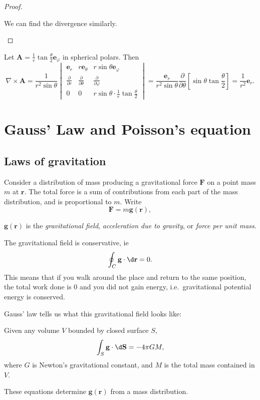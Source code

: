 \documentclass[a4paper]{article}
\begin{document}
\begin{proof}
\begin{enumerate}
      We can find the divergence similarly.
  \end{enumerate}
\end{proof}

\begin{eg}
  Let $\mathbf{A} = \frac{1}{r}\tan \frac{\theta}{2} \mathbf{e}_\varphi$ in spherical polars. Then
  \[
    \nabla\times \mathbf{A} = \frac{1}{r^2\sin \theta}
    \begin{vmatrix}
      \mathbf{e}_r & r\mathbf{e}_\theta & r\sin \theta \mathbf{e}_\varphi\\
      \frac{\partial}{\partial r} & \frac{\partial}{\partial \theta} & \frac{\partial}{\partial \varphi}\\
      0 & 0 & r\sin \theta \cdot \frac{1}{r}\tan \frac{\theta}{2}
    \end{vmatrix} = \frac{\mathbf{e}_r}{r^2\sin \theta}\frac{\partial}{\partial \theta}\left[\sin \theta\tan \frac{\theta}{2}\right] = \frac{1}{r^2}\mathbf{e}_r.
  \]
\end{eg}

\section{Gauss' Law and Poisson's equation}
\subsection{Laws of gravitation}
Consider a distribution of mass producing a gravitational force $\mathbf{F}$ on a point mass $m$ at $\mathbf{r}$. The total force is a sum of contributions from each part of the mass distribution, and is proportional to $m$. Write
\[
  \mathbf{F} = m\mathbf{g}(\mathbf{r}),
\]
\begin{defi}
  $\mathbf{g}(\mathbf{r})$ is the \emph{gravitational field}, \emph{acceleration due to gravity}, or \emph{force per unit mass}.
\end{defi}
The gravitational field is conservative, ie
\[
  \oint_C \mathbf{g}\cdot \d \mathbf{r} = 0.
\]
This means that if you walk around the place and return to the same position, the total work done is $0$ and you did not gain energy, i.e.\ gravitational potential energy is conserved.

Gauss' law tells us what this gravitational field looks like:
\begin{law}
  Given any volume $V$ bounded by closed surface $S$,
  \[
    \int_S \mathbf{g}\cdot \d \mathbf{S} = -4\pi GM,
  \]
  where $G$ is Newton's gravitational constant, and $M$ is the total mass contained in $V$.
\end{law}
These equations determine $\mathbf{g}(\mathbf{r})$ from a mass distribution.
\end{document}
